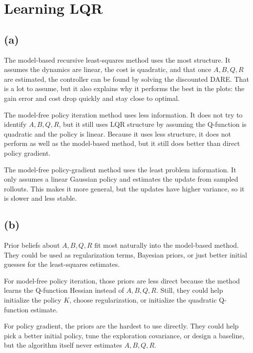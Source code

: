 \section{Learning LQR}

\subsection*{(a)}
The model-based recursive least-squares method uses the most structure. It
assumes the dynamics are linear, the cost is quadratic, and that once
\(A,B,Q,R\) are estimated, the controller can be found by solving the discounted
DARE. That is a lot to assume, but it also explains why it performs the best in
the plots: the gain error and cost drop quickly and stay close to optimal.

The model-free policy iteration method uses less information. It does not try to
identify \(A,B,Q,R\), but it still uses LQR structure by assuming the Q-function
is quadratic and the policy is linear. Because it uses less structure, it does
not perform as well as the model-based method, but it still does better than
direct policy gradient.

The model-free policy-gradient method uses the least problem information. It
only assumes a linear Gaussian policy and estimates the update from sampled
rollouts. This makes it more general, but the updates have higher variance, so
it is slower and less stable.

\subsection*{(b)}
Prior beliefs about \(A,B,Q,R\) fit most naturally into the model-based method.
They could be used as regularization terms, Bayesian priors, or just better
initial guesses for the least-squares estimates.

For model-free policy iteration, those priors are less direct because the method
learns the Q-function Hessian instead of \(A,B,Q,R\). Still, they could help
initialize the policy \(K\), choose regularization, or initialize the quadratic
Q-function estimate.

For policy gradient, the priors are the hardest to use directly. They could help
pick a better initial policy, tune the exploration covariance, or design a
baseline, but the algorithm itself never estimates \(A,B,Q,R\).
